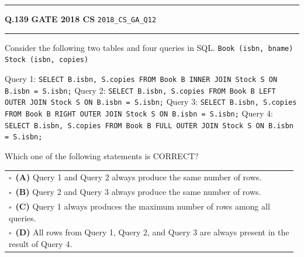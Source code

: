 \documentclass[a4paper,10pt]{article}
\begin{document}
\vspace{6pt}\hrule height 0.35pt\vspace{6pt}
\noindent
\begin{tcolorbox}[
    blanker,
    sidebyside,
    sidebyside align=top,
    lefthand width=0.55\textwidth,
    top=4pt, bottom=4pt, left=0pt, right=0pt,
    middle=16pt,
    underlay={
        \draw[dashed, black!80, line width=0.8pt, dash pattern=on 4pt off 3pt]
            ([xshift=0.55\textwidth+8pt]frame.north west) --
            ([xshift=0.55\textwidth+8pt]frame.south west);
    }
]
\textbf{Q.139}  \hfill {\footnotesize\textbf{GATE 2018 CS} \quad \tiny\texttt{2018\_CS\_GA\_Q12}}
\vspace{2pt}\hrule height 0.3pt\vspace{4pt}

Consider the following two tables and four queries in SQL.
\texttt{Book (isbn, bname)}
\texttt{Stock (isbn, copies)}
\par\medskip
Query 1: \texttt{SELECT B.isbn, S.copies FROM Book B INNER JOIN Stock S ON B.isbn = S.isbn;}
Query 2: \texttt{SELECT B.isbn, S.copies FROM Book B LEFT OUTER JOIN Stock S ON B.isbn = S.isbn;}
Query 3: \texttt{SELECT B.isbn, S.copies FROM Book B RIGHT OUTER JOIN Stock S ON B.isbn = S.isbn;}
Query 4: \texttt{SELECT B.isbn, S.copies FROM Book B FULL OUTER JOIN Stock S ON B.isbn = S.isbn;}
\par\medskip
Which one of the following statements is CORRECT?

\par\vspace{6pt}\noindent
\begin{tabular}{@{}p{0.98\linewidth}@{}}
$\square$\ \textbf{(A)} Query 1 and Query 2 always produce the same number of rows. \\
\addlinespace[3pt]
$\square$\ \textbf{(B)} Query 2 and Query 3 always produce the same number of rows. \\
\addlinespace[3pt]
$\square$\ \textbf{(C)} Query 1 always produces the maximum number of rows among all queries. \\
\addlinespace[3pt]
$\square$\ \textbf{(D)} All rows from Query 1, Query 2, and Query 3 are always present in the result of Query 4.
\end{tabular}

\tcblower


\end{tcolorbox}
\end{document}
